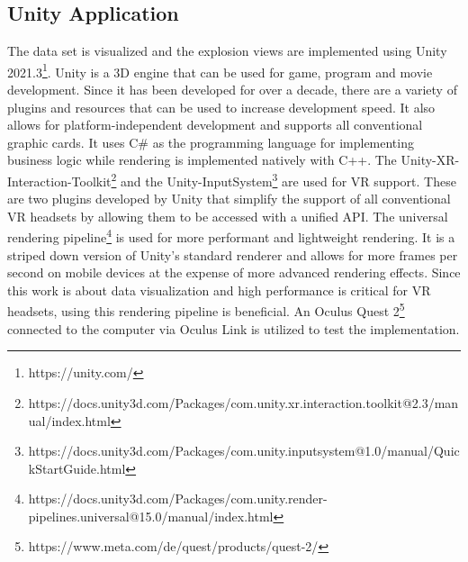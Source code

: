 \subsection{Unity Application}
The data set is visualized and the explosion views are implemented using Unity 2021.3\footnote{https://unity.com/}.
Unity is a 3D engine that can be used for game, program and movie development. 
Since it has been developed for over a decade, there are a variety of plugins and resources that can be used to increase development speed. 
It also allows for platform-independent development and supports all conventional graphic cards. 
It uses C\# as the programming language for implementing business logic while rendering is implemented natively with C++.  
The Unity-XR-Interaction-Toolkit\footnote{https://docs.unity3d.com/Packages/com.unity.xr.interaction.toolkit@2.3/manual/index.html} and the Unity-InputSystem\footnote{https://docs.unity3d.com/Packages/com.unity.inputsystem@1.0/manual/QuickStartGuide.html} are used for VR support.
These are two plugins developed by Unity that simplify the support of all conventional VR headsets by allowing them to be accessed with a unified API.  
The universal rendering pipeline\footnote{https://docs.unity3d.com/Packages/com.unity.render-pipelines.universal@15.0/manual/index.html} is used for more performant and lightweight rendering. It is a striped down version of Unity's standard renderer and allows for more frames per second on mobile devices at the expense of more advanced rendering effects.
Since this work is about data visualization and high performance is critical for VR headsets, using this rendering pipeline is beneficial.
An Oculus Quest 2\footnote{https://www.meta.com/de/quest/products/quest-2/} connected to the computer via Oculus Link is utilized to test the implementation.

